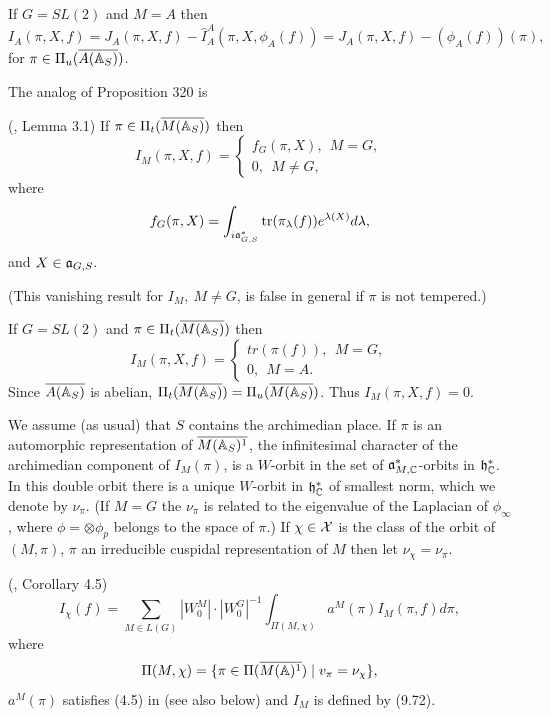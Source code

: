 \begin{example}
If $G=SL(2)$ and $M=A$ then
\[
I_A(\pi,X,f)
=J_A(\pi,X,f)-
\hat{I}_A^A(\pi,X,\phi_A(f))
=J_A(\pi,X,f)-(\phi_A(f))(\pi),
\]
for $\pi\in \Pi_u(\overline{A({\Bbb{A}}_S)})$.
\end{example}

The analog of Proposition 320 is

\begin{proposition}
(\cite{A9}, Lemma 3.1) If $\pi\in\Pi_t(\overline{M({\Bbb{A}}_S)})$ then
\[
I_M(\pi,X,f)=
\left\{
\begin{array}{c}
 f_G(\pi,X),\ \ M=G,\\
 0,\ \ M\not= G,
\end{array}
\right.
\]
where
\[
f_G(\pi,X)=
\int_{i{\frak{a}}^*_{G,S}}
{\rm tr}(\pi_\lambda(f))e^{\lambda(X)}d\lambda,
\]
and $X\in {\frak{a}}_{G,S}$.
\end{proposition}

(This vanishing result for $I_M,\ M\not=G$, is false in
general if $\pi$ is not tempered.)

\begin{example} If $G=SL(2)$ and
$\pi\in\Pi_t(\overline{M({\Bbb{A}}_S)})$ then
\[
I_M(\pi,X,f)=
\left\{
\begin{array}{c}
 tr(\pi(f)),\ \ M=G,\\
 0,\ \ M= A.
\end{array}
\right.
\]
Since $\overline{A({\Bbb{A}}_S)}$ is abelian,
$\Pi_t(\overline{M({\Bbb{A}}_S)})=
\Pi_u(\overline{M({\Bbb{A}}_S)})$. Thus
$I_M(\pi,X,f)=0$.
\end{example}

We assume (as usual) that $S$ contains the archimedian place.
If $\pi$ is an automorphic representation of
$\overline{M({\Bbb{A}}_S)^1}$,
the infinitesimal character of the archimedian
component of $I_M(\pi)$, is a $W$-orbit in the set of
${\frak{a}}_{M,{\Bbb{C}}}^*$-orbits in ${\frak{h}}_{\Bbb{C}}^*$.
In this double orbit there is a unique
$W$-orbit in ${\frak{h}}_{\Bbb{C}}^*$ of smallest norm, which we denote by
$\nu_\pi$. (If $M=G$ the $\nu_\pi$ is related to the eigenvalue
of the Laplacian of $\phi_\infty$,
where $\phi =\otimes \phi_p$
belongs to the space of $\pi$.)
If $\chi\in {\cal{X}}$ is the class of the orbit of
$(M,\pi)$, $\pi$ an irreducible cuspidal representation of $M$ then let
$\nu_\chi =\nu_\pi$.

\begin{theorem} (\cite{A10}, Corollary 4.5) 
\[
I_\chi
(f)
=\sum_{M\in L(G)}|W_0^M|\cdot |W_0^G|^{-1}
\int_{\Pi (M,\chi)}a^M(\pi )I_M(\pi ,f)d\pi ,
\]
where 
\[
\Pi (M,\chi )=
\{\pi \in \Pi (\overline{M({\Bbb{A}})^1})\;|\;v_\pi =\nu_\chi \},
\]
$a^M(\pi )$ satisfies (4.5) in \cite{A10} (see also below)
and $I_M$ is defined by (9.72).
\end{theorem}

